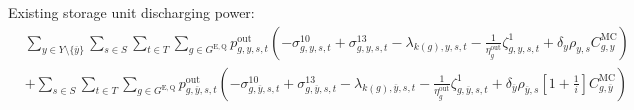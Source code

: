 \documentclass{article}
\newcommand{\sStorageExisting}{G^{\mathrm{E,Q}}}
\newcommand{\sYears}{Y}
\newcommand{\sScenarios}{S}
\newcommand{\sIntervals}{T}
\newcommand{\iGenerator}{g}
\newcommand{\iYear}{y}
\newcommand{\iYearTerminal}{\overline{\iYear}}
\newcommand{\iScenario}{s}
\newcommand{\iInterval}{t}
\newcommand{\iIntervalTerminal}{\overline{\iInterval}}
\newcommand{\iZone}{z}
\newcommand{\cScenarioDuration}[1][\iYear,\iScenario]{\rho_{#1}}
\newcommand{\cMarginalCost}[1][\iGenerator,\iYear]{C^{\mathrm{MC}}_{#1}}
\newcommand{\cInterestRate}{i}
\newcommand{\cStorageUnitEfficiencyDischarging}{\eta_{\iGenerator}^{\mathrm{out}}}
\newcommand{\cDiscountRate}[1][\iYear]{\delta_{#1}}
\newcommand{\vPowerOut}[1][\iGenerator,\iYear,\iScenario,\iInterval]{p^{\mathrm{out}}_{#1}}
\newcommand{\dNonNegativeDischarging}[1][\iGenerator,\iYear,\iScenario,\iInterval]{\sigma_{#1}^{10}}
\newcommand{\dMaxDischargingRateExisting}[1][\iGenerator,\iYear,\iScenario,\iInterval]{\sigma_{#1}^{13}}
\newcommand{\dRampRateUpStorageDischarging}[1][\iGenerator,\iYear,\iScenario,\iInterval]{\sigma_{#1}^{22}}
\newcommand{\dRampRateDownStorageDischarging}[1][\iGenerator,\iYear,\iScenario,\iInterval]{\sigma_{#1}^{25}}
\newcommand{\dPowerBalance}[1][\iZone,\iYear,\iScenario,\iInterval]{\lambda_{#1}}
\newcommand{\dStorageEnergyTransition}[1][\iGenerator,\iYear,\iScenario,\iInterval]{\zeta_{#1}^{1}}
\newcommand{\dStorageEnergyOutput}[1][\iGenerator,\iYear,\iScenario,\iInterval]{\zeta_{#1}^{3}}
\begin{document}
Existing storage unit discharging power:
\begin{align}
	& \sum\limits_{\iYear \in \sYears \setminus \{\iYearTerminal\}}\sum\limits_{\iScenario \in \sScenarios}\sum\limits_{\iInterval \in \sIntervals 
	} \sum\limits_{\iGenerator \in \sStorageExisting} \vPowerOut \left( - \dNonNegativeDischarging + \dMaxDischargingRateExisting - \dPowerBalance[k(\iGenerator),\iYear,\iScenario,\iInterval] - \frac{1}{\cStorageUnitEfficiencyDischarging} \dStorageEnergyTransition + \cDiscountRate \cScenarioDuration \cMarginalCost \right) \nonumber\\
	& + \sum\limits_{\iScenario \in \sScenarios}\sum\limits_{\iInterval \in \sIntervals 
} \sum\limits_{\iGenerator \in \sStorageExisting} \vPowerOut[\iGenerator,\iYearTerminal,\iScenario,\iInterval] \left( - \dNonNegativeDischarging[\iGenerator,\iYearTerminal,\iScenario,\iInterval] + \dMaxDischargingRateExisting[\iGenerator,\iYearTerminal,\iScenario,\iInterval] - \dPowerBalance[k(\iGenerator),\iYearTerminal,\iScenario,\iInterval] - \frac{1}{\cStorageUnitEfficiencyDischarging} \dStorageEnergyTransition[\iGenerator,\iYearTerminal,\iScenario,\iInterval] + \cDiscountRate[\iYearTerminal] \cScenarioDuration[\iYearTerminal,\iScenario] \left[1 + \frac{1}{\cInterestRate}\right] \cMarginalCost[\iGenerator,\iYearTerminal] \right) \nonumber\\
\end{align}
\end{document}
